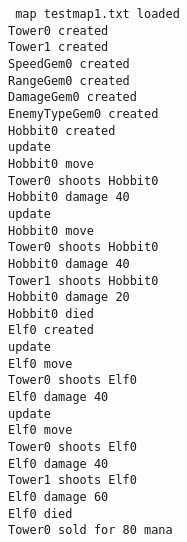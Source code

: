 \begin{itemize}
\texttt{
map testmap1.txt loaded \\
Tower0 created \\
Tower1 created  \\
SpeedGem0 created \\
RangeGem0 created \\
DamageGem0 created \\
EnemyTypeGem0 created \\
Hobbit0 created \\
update \\
Hobbit0 move \\
Tower0 shoots Hobbit0 \\
Hobbit0 damage 40 \\
update \\
Hobbit0 move  \\
Tower0 shoots Hobbit0 \\
Hobbit0 damage 40 \\
Tower1 shoots Hobbit0 \\
Hobbit0 damage 20 \\
Hobbit0 died \\
Elf0 created \\
update \\
Elf0 move \\
Tower0 shoots Elf0 \\
Elf0 damage 40 \\
update \\
Elf0 move  \\
Tower0 shoots Elf0 \\
Elf0 damage 40 \\
Tower1 shoots Elf0 \\
Elf0 damage 60 \\
Elf0 died \\
Tower0 sold for 80 mana \\
}
\end{itemize}

